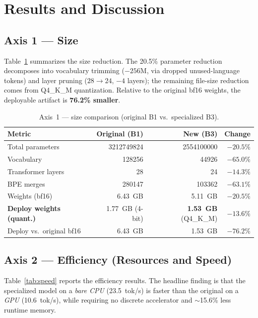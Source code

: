 \documentclass[11pt,a4paper]{article}
\begin{document}
\section{Results and Discussion}
\label{sec:results}

\subsection{Axis 1 --- Size}
Table~\ref{tab:size} summarizes the size reduction. The 20.5\% parameter
reduction decomposes into vocabulary trimming ($-256$M, via dropped
unused-language tokens) and layer pruning ($28{\to}24$, $-4$ layers); the
remaining file-size reduction comes from Q4\_K\_M quantization. Relative to
the original bf16 weights, the deployable artifact is \textbf{76.2\%
smaller}.

\begin{table}[H]
  \centering
  \caption{Axis~1 --- size comparison (original B1 vs.\ specialized B3).}
  \label{tab:size}
  \begin{tabular}{lrrr}
    \toprule
    \textbf{Metric} & \textbf{Original (B1)} & \textbf{New (B3)} & \textbf{Change} \\
    \midrule
    Total parameters             & \num{3212749824} & \num{2554100000} & $-20.5\%$ \\
    Vocabulary                   & \num{128256}     & \num{44926}      & $-65.0\%$ \\
    Transformer layers           & 28               & 24               & $-14.3\%$ \\
    BPE merges                   & \num{280147}     & \num{103362}     & $-63.1\%$ \\
    Weights (bf16)               & \SI{6.43}{GB}    & \SI{5.11}{GB}    & $-20.5\%$ \\
    \textbf{Deploy weights (quant.)} & \SI{1.77}{GB} (4-bit) & \textbf{\SI{1.53}{GB}} (Q4\_K\_M) & $-13.6\%$ \\
    Deploy vs.\ original bf16     & \SI{6.43}{GB}    & \SI{1.53}{GB}    & $\mathbf{-76.2\%}$ \\
    \bottomrule
  \end{tabular}
\end{table}

\subsection{Axis 2 --- Efficiency (Resources and Speed)}
Table~\ref{tab:speed} reports the efficiency results. The headline finding is
that the specialized model on a \emph{bare CPU} (\SI{23.5}{tok/s}) is faster
than the original on a \emph{GPU} (\SI{10.6}{tok/s}), while requiring no
discrete accelerator and $\sim$15.6\% less runtime memory.
\end{document}
